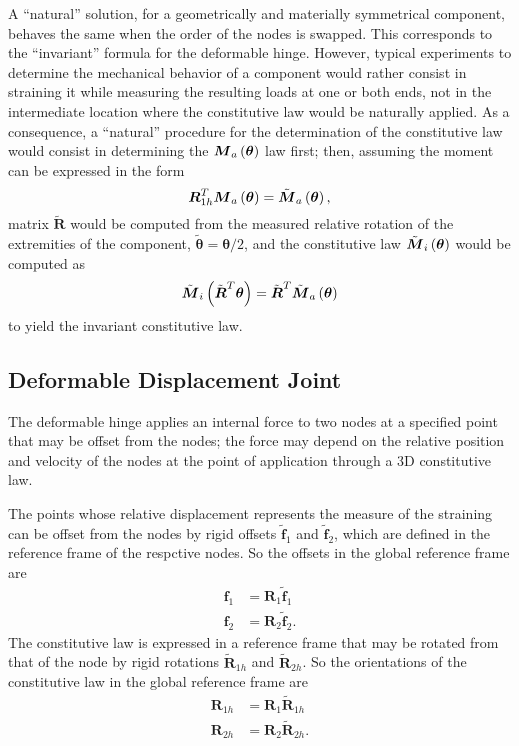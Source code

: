 \documentclass[10pt,dvips,fleqn]{report}
\newcommand{\T}[1]{\boldsymbol{#1}}
\begin{document}
A ``natural'' solution, for a geometrically and materially symmetrical
component, behaves the same when the order of the nodes is swapped.
This corresponds to the ``invariant'' formula for the deformable hinge.
However, typical experiments to determine the mechanical behavior
of a component would rather consist in straining it while measuring
the resulting loads at one or both ends, not in the intermediate
location where the constitutive law would be naturally applied.
As a consequence, a ``natural'' procedure for the determination
of the constitutive law would consist in determining 
the $\T{M}_a\plbr{\T{\theta}}$ law first; 
then, assuming the moment can be expressed in the form
\begin{equation}
	\T{R}_{1h}^T \T{M}_a\plbr{\T{\theta}}
		= \tilde{\T{M}}_a\plbr{\T{\theta}} ,
\end{equation}
matrix $\tilde{\T{R}}$ would be computed
from the measured relative rotation of the extremities of the component,
$\tilde{\T{\theta}}=\T{\theta}/2$,
and the constitutive law $\tilde{\T{M}}_i\plbr{\T{\theta}}$ 
would be computed as
\begin{equation}
	\tilde{\T{M}}_i\plbr{\tilde{\T{R}}^T \T{\theta}}
		= \tilde{\T{R}}^T \tilde{\T{M}}_a\plbr{\T{\theta}}
\end{equation}
to yield the invariant constitutive law.




\subsection{Deformable Displacement Joint}
The deformable hinge applies an internal force to two nodes at a specified 
point that may be offset from the nodes; the force may depend on the relative
position and velocity of the nodes at the point of application
through a 3D constitutive law.

The points whose relative displacement represents the measure 
of the straining can be offset from the nodes by rigid offsets
$\tilde{\T{f}}_1$ and $\tilde{\T{f}}_2$, which are defined
in the reference frame of the respctive nodes.
So the offsets in the global reference frame are
\begin{align}
	\T{f}_1 &= \T{R}_1 \tilde{\T{f}}_1 \\
	\T{f}_2 &= \T{R}_2 \tilde{\T{f}}_2 .
\end{align}
The constitutive law is expressed in a reference frame that may be rotated
from that of the node by rigid rotations $\tilde{\T{R}}_{1h}$
and $\tilde{\T{R}}_{2h}$.
So the orientations of the constitutive law in the global reference frame are
\begin{align}
	\T{R}_{1h} &= \T{R}_1 \tilde{\T{R}}_{1h} \\
	\T{R}_{2h} &= \T{R}_2 \tilde{\T{R}}_{2h} .
\end{align}
\end{document}
